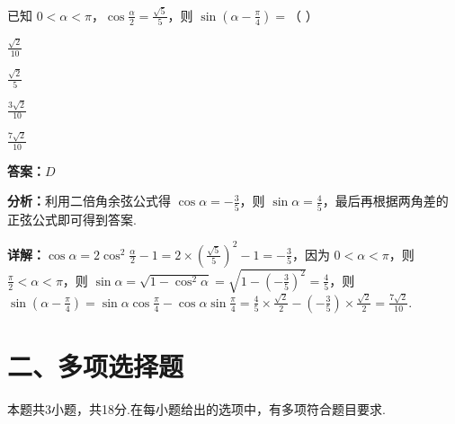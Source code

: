 \begin{question}[points=5]
已知 $0<\alpha<\pi$，$\cos\frac{\alpha}{2}=\frac{\sqrt{5}}{5}$，则 $\sin\left(\alpha-\frac{\pi}{4}\right)=$（ ）
\begin{choices}
  \item $\frac{\sqrt{2}}{10}$
  \item $\frac{\sqrt{2}}{5}$
  \item $\frac{3\sqrt{2}}{10}$
  \item $\frac{7\sqrt{2}}{10}$
\end{choices}
\begin{solution}
\textbf{答案：}$D$

\textbf{分析：}利用二倍角余弦公式得 $\cos\alpha=-\frac{3}{5}$，则 $\sin\alpha=\frac{4}{5}$，最后再根据两角差的正弦公式即可得到答案.

\textbf{详解：}$\cos\alpha=2\cos^2\frac{\alpha}{2}-1=2\times\left(\frac{\sqrt{5}}{5}\right)^2-1=-\frac{3}{5}$，因为 $0<\alpha<\pi$，则 $\frac{\pi}{2}<\alpha<\pi$，则 $\sin\alpha=\sqrt{1-\cos^2\alpha}=\sqrt{1-\left(-\frac{3}{5}\right)^2}=\frac{4}{5}$，则 $\sin\left(\alpha-\frac{\pi}{4}\right)=\sin\alpha\cos\frac{\pi}{4}-\cos\alpha\sin\frac{\pi}{4}=\frac{4}{5}\times\frac{\sqrt{2}}{2}-\left(-\frac{3}{5}\right)\times\frac{\sqrt{2}}{2}=\frac{7\sqrt{2}}{10}$.
\end{solution}
\end{question}

\section*{二、多项选择题}
本题共3小题，共18分.在每小题给出的选项中，有多项符合题目要求.

